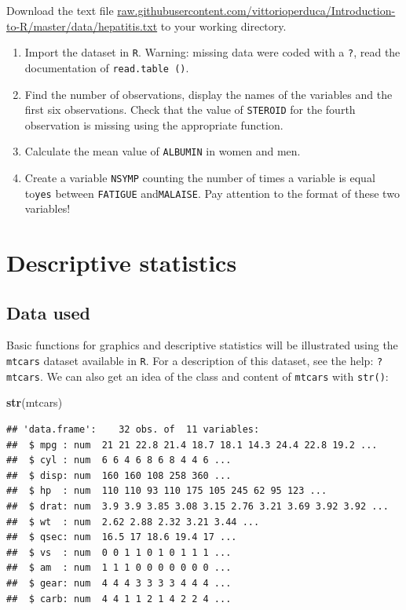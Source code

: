 \documentclass[]{book}
\newenvironment{Shaded}{\begin{snugshade}}{\end{snugshade}}
\newcommand{\KeywordTok}[1]{\textcolor[rgb]{0.13,0.29,0.53}{\textbf{#1}}}
\newcommand{\NormalTok}[1]{#1}
\providecommand{\tightlist}{%
  \setlength{\itemsep}{0pt}\setlength{\parskip}{0pt}}
\begin{document}
Download the text file \href{https://raw.githubusercontent.com/vittorioperduca/Introduction-to-R/master/data/hepatitis.txt}{raw.githubusercontent.com/vittorioperduca/Introduction-to-R/master/data/hepatitis.txt} to your working directory.

\begin{enumerate}
\def\labelenumi{\arabic{enumi}.}
\tightlist
\item
  Import the dataset in \texttt{R}. Warning: missing data were coded with a \texttt{?}, read the documentation of \texttt{read.table\ ()}.
\item
  Find the number of observations, display the names of the variables and the first six observations. Check that the value of \texttt{STEROID} for the fourth observation is missing using the appropriate function.
\item
  Calculate the mean value of \texttt{ALBUMIN} in women and men.
\item
  Create a variable \texttt{NSYMP} counting the number of times a variable is equal to\texttt{yes} between \texttt{FATIGUE} and\texttt{MALAISE}. Pay attention to the format of these two variables!
\end{enumerate}

\hypertarget{descriptive-statistics}{%
\chapter{Descriptive statistics}\label{descriptive-statistics}}

\hypertarget{data-used}{%
\section{Data used}\label{data-used}}

Basic functions for graphics and descriptive statistics will be illustrated using the \texttt{mtcars} dataset available in \texttt{R}. For a description of this dataset, see the help: \texttt{?mtcars}. We can also get an idea of the class and content of \texttt{mtcars} with \texttt{str()}:

\begin{Shaded}
\begin{Highlighting}[]
\KeywordTok{str}\NormalTok{(mtcars)}
\end{Highlighting}
\end{Shaded}

\begin{verbatim}
## 'data.frame':	32 obs. of  11 variables:
##  $ mpg : num  21 21 22.8 21.4 18.7 18.1 14.3 24.4 22.8 19.2 ...
##  $ cyl : num  6 6 4 6 8 6 8 4 4 6 ...
##  $ disp: num  160 160 108 258 360 ...
##  $ hp  : num  110 110 93 110 175 105 245 62 95 123 ...
##  $ drat: num  3.9 3.9 3.85 3.08 3.15 2.76 3.21 3.69 3.92 3.92 ...
##  $ wt  : num  2.62 2.88 2.32 3.21 3.44 ...
##  $ qsec: num  16.5 17 18.6 19.4 17 ...
##  $ vs  : num  0 0 1 1 0 1 0 1 1 1 ...
##  $ am  : num  1 1 1 0 0 0 0 0 0 0 ...
##  $ gear: num  4 4 4 3 3 3 3 4 4 4 ...
##  $ carb: num  4 4 1 1 2 1 4 2 2 4 ...
\end{verbatim}
\end{document}
